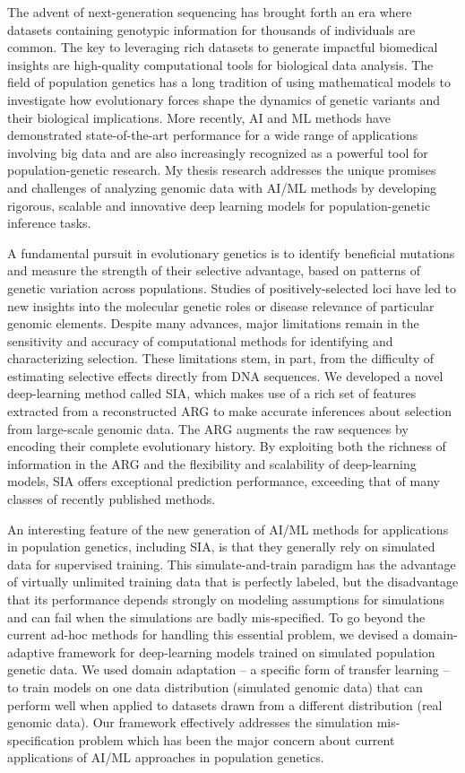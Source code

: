 The advent of next-generation sequencing has brought forth an era where datasets containing genotypic information for thousands of individuals are common. The key to leveraging rich datasets to generate impactful biomedical insights are high-quality computational tools for biological data analysis. The field of population genetics has a long tradition of using mathematical models to investigate how evolutionary forces shape the dynamics of genetic variants and their biological implications. More recently, \ac{AI} and \ac{ML} methods have demonstrated state-of-the-art performance for a wide range of applications involving big data and are also increasingly recognized as a powerful tool for population-genetic research. My thesis research addresses the unique promises and challenges of analyzing genomic data with \ac{AI}/\ac{ML} methods by developing rigorous, scalable and innovative deep learning models for population-genetic inference tasks.

A fundamental pursuit in evolutionary genetics is to identify beneficial mutations and measure the strength of their selective advantage, based on patterns of genetic variation across populations. Studies of positively-selected loci have led to new insights into the molecular genetic roles or disease relevance of particular genomic elements. Despite many advances, major limitations remain in the sensitivity and accuracy of computational methods for identifying and characterizing selection. These limitations stem, in part, from the difficulty of estimating selective effects directly from DNA sequences. We developed a novel deep-learning method called \ac{SIA}, which makes use of a rich set of features extracted from a reconstructed \ac{ARG} to make accurate inferences about selection from large-scale genomic data. The \ac{ARG} augments the raw sequences by encoding their complete evolutionary history. By exploiting both the richness of information in the \ac{ARG} and the flexibility and scalability of deep-learning models, \ac{SIA} offers exceptional prediction performance, exceeding that of many classes of recently published methods.

An interesting feature of the new generation of \ac{AI}/\ac{ML} methods for applications in population genetics, including \ac{SIA}, is that they generally rely on simulated data for supervised training. This simulate-and-train paradigm has the advantage of virtually unlimited training data that is perfectly labeled, but the disadvantage that its performance depends strongly on modeling assumptions for simulations and can fail when the simulations are badly mis-specified. To go beyond the current ad-hoc methods for handling this essential problem, we devised a domain-adaptive framework for deep-learning models trained on simulated population genetic data. We used domain adaptation – a specific form of transfer learning – to train models on one data distribution (simulated genomic data) that can perform well when applied to datasets drawn from a different distribution (real genomic data). Our framework effectively addresses the simulation mis-specification problem which has been the major concern about current applications of \ac{AI}/\ac{ML} approaches in population genetics.


